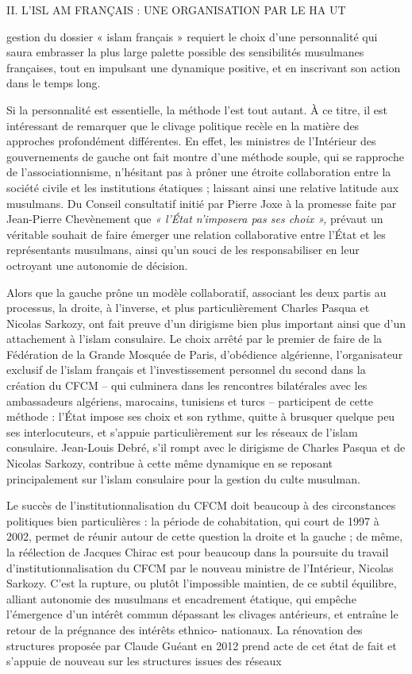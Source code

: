 II. L'ISL AM FRANÇAIS : UNE ORGANISATION PAR LE HA UT

gestion du dossier « islam français » requiert le choix d'une
personnalité qui saura embrasser la plus large palette possible des
sensibilités musulmanes françaises, tout en impulsant une dynamique
positive, et en inscrivant son action dans le temps long.

Si la personnalité est essentielle, la méthode l'est tout autant. À ce
titre, il est intéressant de remarquer que le clivage politique recèle
en la matière des approches profondément différentes. En effet, les
ministres de l'Intérieur des gouvernements de gauche ont fait montre
d'une méthode souple, qui se rapproche de l'associationnisme, n'hésitant
pas à prôner une étroite collaboration entre la société civile et les
institutions étatiques ; laissant ainsi une relative latitude aux
musulmans. Du Conseil consultatif initié par Pierre Joxe à la promesse
faite par Jean-Pierre Chevènement que \emph{« l'État n'imposera pas ses
choix »,} prévaut un véritable souhait de faire émerger une relation
collaborative entre l'État et les représentants musulmans, ainsi qu'un
souci de les responsabiliser en leur octroyant une autonomie de
décision.

Alors que la gauche prône un modèle collaboratif, associant les deux
partis au processus, la droite, à l'inverse, et plus particulièrement
Charles Pasqua et Nicolas Sarkozy, ont fait preuve d'un dirigisme bien
plus important ainsi que d'un attachement à l'islam consulaire. Le choix
arrêté par le premier de faire de la Fédération de la Grande Mosquée de
Paris, d'obédience algérienne, l'organisateur exclusif de l'islam
français et l'investissement personnel du second dans la création du
CFCM -- qui culminera dans les rencontres bilatérales avec les
ambassadeurs algériens, marocains, tunisiens et turcs -- participent de
cette méthode : l'État impose ses choix et son rythme, quitte à brusquer
quelque peu ses interlocuteurs, et s'appuie particulièrement sur les
réseaux de l'islam consulaire. Jean-Louis Debré, s'il rompt avec le
dirigisme de Charles Pasqua et de Nicolas Sarkozy, contribue à cette
même dynamique en se reposant principalement sur l'islam consulaire pour
la gestion du culte musulman.

Le succès de l'institutionnalisation du CFCM doit beaucoup à des
circonstances politiques bien particulières : la période de
cohabitation, qui court de 1997 à 2002, permet de réunir autour de cette
question la droite et la gauche ; de même, la réélection de Jacques
Chirac est pour beaucoup dans la poursuite du travail
d'institutionnalisation du CFCM par le nouveau ministre de l'Intérieur,
Nicolas Sarkozy. C'est la rupture, ou plutôt l'impossible maintien, de
ce subtil équilibre, alliant autonomie des musulmans et encadrement
étatique, qui empêche l'émergence d'un intérêt commun dépassant les
clivages antérieurs, et entraîne le retour de la prégnance des intérêts
ethnico- nationaux. La rénovation des structures proposée par Claude
Guéant en 2012 prend acte de cet état de fait et s'appuie de nouveau sur
les structures issues des réseaux



